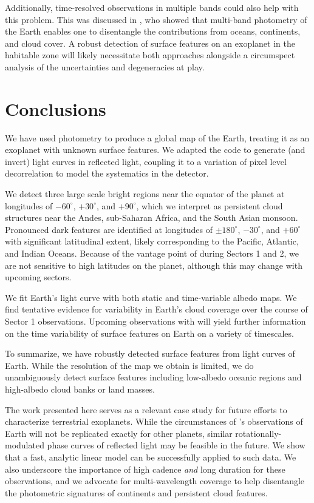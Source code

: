 \documentclass[modern]{aastex62}
\begin{document}
Additionally, time-resolved observations in multiple bands could
also help with this problem. This was discussed in \cite{Cowan2009},
who showed that multi-band photometry of the Earth enables one to
disentangle the contributions from oceans, continents, and cloud cover.
A robust detection of surface features on an exoplanet in the habitable
zone will likely necessitate both approaches alongside a circumspect
analysis of the uncertainties and degeneracies at play.

\section{Conclusions}
\label{sec:conclusions}

We have used \TESS photometry to
produce a global map of the Earth, treating it as an exoplanet with unknown
surface features. We adapted the \starry code to 
generate (and invert) light curves in reflected light, coupling it
to a variation of pixel level decorrelation to model the systematics
in the \TESS detector. 

We detect three large scale bright regions near
the equator of the planet at longitudes of 
$-60^\circ$, $+30^\circ$, and $+90^\circ$, 
which we interpret as persistent cloud structures 
near the Andes, sub-Saharan Africa, and the South Asian monsoon. 
Pronounced dark features are identified
at longitudes of $\pm 180^\circ$, $-30^\circ$, and $+60^\circ$ with
significant latitudinal extent, likely corresponding to 
the Pacific, Atlantic, and Indian Oceans. Because of the
vantage point of \TESS during Sectors 1 and 2, we are not sensitive to
high latitudes on the planet, although this may change with upcoming
sectors. 

We fit Earth's light curve with both static and time-variable albedo maps. 
We find tentative evidence for variability in Earth's cloud coverage over 
the course of Sector 1 observations. 
Upcoming observations with \TESS will yield further information on 
the time variability of surface features on Earth on a variety of timescales.

To summarize, we have robustly detected surface features from \TESS 
light curves of Earth. While the resolution of the map we obtain is limited, 
we do unambiguously detect surface features including low-albedo oceanic regions and 
high-albedo cloud banks or land masses. 

The work presented here serves as a relevant case study for future 
efforts to characterize terrestrial exoplanets. While the circumstances of \TESS's 
observations of Earth will not be replicated exactly for other planets, similar 
rotationally-modulated phase curves of reflected light may be feasible in the future. 
We show that a fast, analytic linear model can be successfully applied to such data. 
We also underscore the importance of high cadence \emph{and} long duration for 
these observations, and we advocate for multi-wavelength coverage to 
help disentangle the photometric signatures of continents and persistent cloud features.
\end{document}
